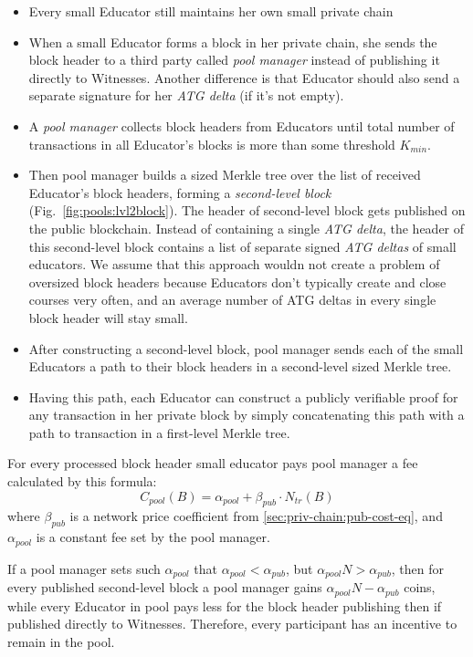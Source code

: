 \begin{itemize}
\item Every small Educator still maintains her own small private chain
\item When a small Educator forms a block in her private chain, she sends the
  block header to a third party called \textit{pool manager} instead of
  publishing it directly to Witnesses. Another difference is that Educator
  should also send a separate signature for her \textit{ATG delta} (if it's not
  empty).
\item A \textit{pool manager} collects block headers from Educators until
  total number of transactions in all Educator's blocks is more than some
  threshold $K_{min}$.
\item Then pool manager builds a sized Merkle tree over the list of received
  Educator's block headers, forming a \textit{second-level block}
  (Fig.~\ref{fig:pools:lvl2block}). The header of second-level block gets published
  on the public blockchain. Instead of containing a single \textit{ATG delta},
  the header of this second-level block contains a list of separate signed
  \textit{ATG deltas} of small educators. We assume that this approach wouldn
  not create a problem of oversized block headers because Educators don't
  typically create and close courses very often, and an average number of ATG
  deltas in every single block header will stay small.
\item After constructing a second-level block, pool manager sends each of the
  small Educators a path to their block headers in a second-level sized Merkle tree.
\item Having this path, each Educator can construct a publicly verifiable proof
  for any transaction in her private block by simply concatenating this path
  with a path to transaction in a first-level Merkle tree.
\end{itemize}

For every processed block header small educator pays pool manager a fee
calculated by this formula:
\begin{equation}\label{apx:pools:pools-cost-eq}
  C_{pool}(B) = \alpha_{pool} + \beta_{pub} \cdot N_{tr}(B)
\end{equation}
where $\beta_{pub}$ is a network price coefficient from
\ref{sec:priv-chain:pub-cost-eq}, and $\alpha_{pool}$ is a constant fee set by
the pool manager.

If a pool manager sets such $\alpha_{pool}$ that
$\alpha_{pool} < \alpha_{pub}$, but $\alpha_{pool} N > \alpha_{pub}$, then for
every published second-level block a pool manager gains
$\alpha_{pool} N - \alpha_{pub}$ coins, while every Educator in pool pays less
for the block header publishing then if published directly to Witnesses.
Therefore, every participant has an incentive to remain in the pool.

